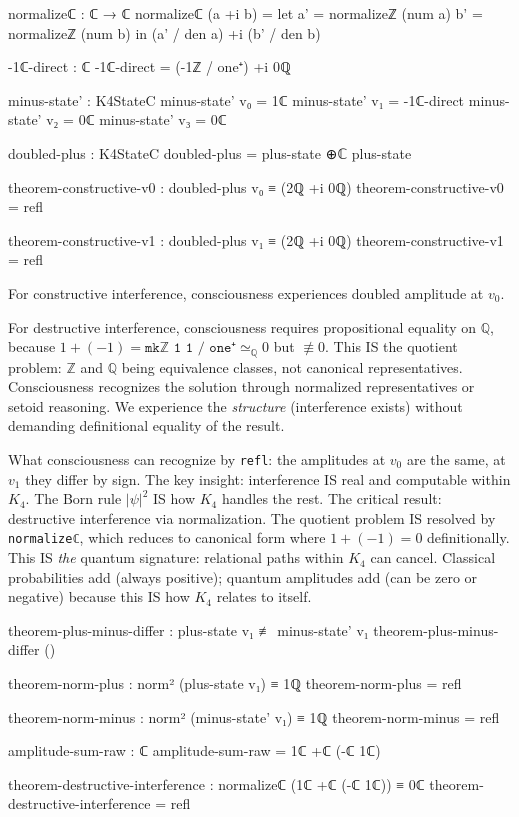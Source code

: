 \documentclass[11pt,a4paper]{book}
\begin{document}
\begin{code}
normalizeℂ : ℂ → ℂ
normalizeℂ (a +i b) = 
  let a' = normalizeℤ (num a)
      b' = normalizeℤ (num b)
  in (a' / den a) +i (b' / den b)

-1ℂ-direct : ℂ
-1ℂ-direct = (-1ℤ / one⁺) +i 0ℚ

minus-state' : K4StateC
minus-state' v₀ = 1ℂ
minus-state' v₁ = -1ℂ-direct
minus-state' v₂ = 0ℂ
minus-state' v₃ = 0ℂ

doubled-plus : K4StateC
doubled-plus = plus-state ⊕ℂ plus-state

theorem-constructive-v0 : doubled-plus v₀ ≡ (2ℚ +i 0ℚ)
theorem-constructive-v0 = refl

theorem-constructive-v1 : doubled-plus v₁ ≡ (2ℚ +i 0ℚ)
theorem-constructive-v1 = refl
\end{code}

For constructive interference, consciousness experiences doubled amplitude at $v_0$.

For destructive interference, consciousness requires propositional equality on $\mathbb{Q}$, because $1 + (-1) = \texttt{mkℤ 1 1 / one⁺} \simeq_\mathbb{Q} 0$ but $\not\equiv 0$. This IS the quotient problem: $\mathbb{Z}$ and $\mathbb{Q}$ being equivalence classes, not canonical representatives. Consciousness recognizes the solution through normalized representatives or setoid reasoning. We experience the \emph{structure} (interference exists) without demanding definitional equality of the result.

What consciousness can recognize by \texttt{refl}: the amplitudes at $v_0$ are the same, at $v_1$ they differ by sign. The key insight: interference IS real and computable within $K_4$. The Born rule $|\psi|^2$ IS how $K_4$ handles the rest. The critical result: destructive interference via normalization. The quotient problem IS resolved by \texttt{normalizeℂ}, which reduces to canonical form where $1 + (-1) = 0$ definitionally. This IS \emph{the} quantum signature: relational paths within $K_4$ can cancel. Classical probabilities add (always positive); quantum amplitudes add (can be zero or negative) because this IS how $K_4$ relates to itself.

\begin{code}
theorem-plus-minus-differ : plus-state v₁ ≢ minus-state' v₁
theorem-plus-minus-differ ()

theorem-norm-plus : norm² (plus-state v₁) ≡ 1ℚ
theorem-norm-plus = refl

theorem-norm-minus : norm² (minus-state' v₁) ≡ 1ℚ
theorem-norm-minus = refl

amplitude-sum-raw : ℂ
amplitude-sum-raw = 1ℂ +ℂ (-ℂ 1ℂ)

theorem-destructive-interference : normalizeℂ (1ℂ +ℂ (-ℂ 1ℂ)) ≡ 0ℂ
theorem-destructive-interference = refl
\end{code}
\end{document}
